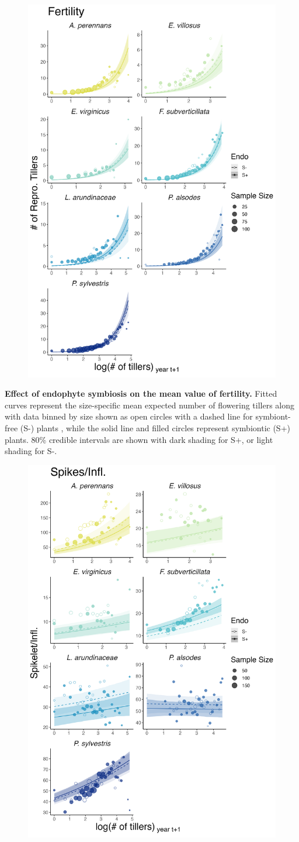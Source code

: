 \documentclass[12pt]{article}
\begin{document}
\begin{figure}[H]
	\centering
	\includegraphics[width=.6\linewidth]{fert_meanplot.png}
\end{figure}
 \textbf{Effect of endophyte symbiosis on the mean value of fertility.} Fitted curves represent the size-specific mean expected number of flowering tillers along with data binned by size shown as open circles with a dashed line for symbiont-free (S-) plants , while the solid line and filled circles represent symbiontic (S+) plants. 80\% credible intervals are shown with dark shading for  S+, or light shading for S-.
\newpage
\begin{figure}[H]
	\centering
	\includegraphics[width=.6\linewidth]{spike_meanplot.png}
\end{figure}
\end{document}
